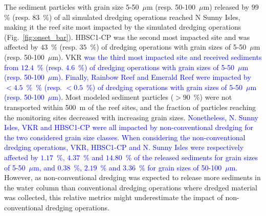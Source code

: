 \documentclass[preprint,12pt,authoryear]{elsarticle}
\newcommand{\modif}[1]{\textcolor{blue}{#1}}
\begin{document}
The sediment particles with grain size 5-50~$\mu$m (resp. 50-100~$\mu$m) released by $99$ \% (resp. $83$~\%) of all simulated dredging operations reached N Sunny Isles, making it the reef site most impacted by the simulated dredging operations (Fig.~\ref{fig:onset_bar}). HBSC1-CP was the second most impacted site and was affected by $43$~\% (resp. $35$~\%) of dredging operations with grain sizes of 5-50~$\mu$m (resp. 50-100~$\mu$m). VKR \modif{was the third most impacted site and received sediments from $12.4$~\% (resp. $4.6$~\%) of dredging operations with grain sizes of 5-50~$\mu$m (resp. 50-100~$\mu$m). Finally, Rainbow Reef and Emerald Reef were impacted by $<4.5$~\%~\% (resp. $<0.5$~\%) of dredging operations with grain sizes of 5-50~$\mu$m (resp. 50-100~$\mu$m)}. Most modeled sediment particles ($>90$~\%) were not transported within 500~m of the reef sites, and the fraction of particles reaching the monitoring sites decreased with increasing grain sizes. \modif{Nonetheless, N. Sunny Isles, VKR and HBSC1-CP were all impacted by non-conventional dredging for the two considered grain size classes. When considering the non-conventional dredging operations, VKR, HBSC1-CP and N. Sunny Isles were respectively affected by $1.17$~\%, $4.37$~\% and $14.80$~\% of the released sediments for grain sizes of 5-50~$\mu$m, and $0.38$~\%, $2.19$~\% and $3.36$~\% for grain sizes of 50-100~$\mu$m.} However, as non-conventional dredging was expected to release more sediments in the water column than conventional dredging operations where dredged material was collected, this relative metrics might underestimate the impact of non-conventional dredging operations.
\end{document}
